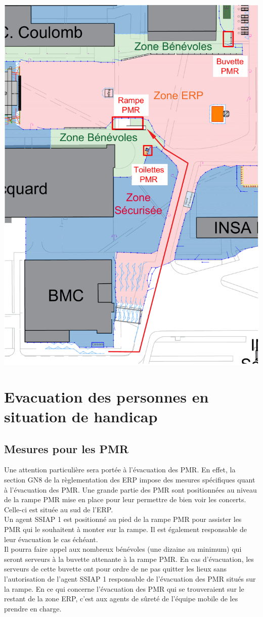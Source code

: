 \documentclass[hidelinks, paper=a4, fontsize=13pt]{report}
\begin{document}
\begin{center}
\includegraphics[width=.8\textwidth,keepaspectratio]{Exports/Plan_24h_45eme-PMR_sud}
\end{center}

\newpage
\section{Evacuation des personnes en situation de handicap}

\subsection{Mesures pour les PMR}

Une attention particulière sera portée à l’évacuation des PMR. En effet, la section GN8 de la règlementation des ERP impose des mesures spécifiques quant à l’évacuation des PMR.
Une grande partie des PMR sont positionnées au niveau de la rampe PMR mise en place pour leur permettre de bien voir les concerts. Celle-ci est située au sud de l’ERP.\\

Un agent SSIAP 1 est positionné au pied de la rampe PMR pour assister les PMR qui le souhaitent à monter sur la rampe. Il est également responsable de leur évacuation le cas échéant.\\
Il pourra faire appel aux nombreux bénévoles (une dizaine au minimum) qui seront serveurs à la buvette attenante à la rampe PMR. En cas d’évacuation, les serveurs de cette buvette ont pour ordre de ne pas quitter les lieux sans l’autorisation de l’agent SSIAP 1 responsable de l’évacuation des PMR situés sur la rampe.
En ce qui concerne l’évacuation des PMR qui se trouveraient sur le restant de la zone ERP, c’est aux agents de sûreté de l'équipe mobile de les prendre en charge. 
\end{document}

